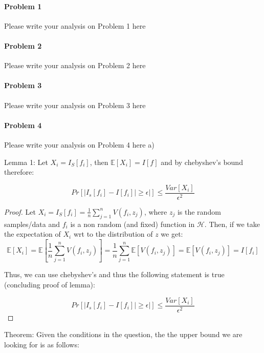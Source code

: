 \documentclass[12pt]{report}
\begin{document}
\maketitle

\paragraph{Problem 1}
Please write your analysis on Problem 1 here


\paragraph{Problem 2}
Please write your analysis on Problem 2 here



\paragraph{Problem 3}
Please write your analysis on Problem 3 here


\paragraph{Problem 4}
Please write your analysis on Problem 4 here
a)


Lemma 1: Let $X_i = I_S[f_i]$, then $\mathbb{E}[X_i] = I[f]$ and by chebyshev's bound therefore:

$$ Pr[ | I_s[f_i] - I[f_i] | \geq \epsilon|] \leq \frac{ Var[X_i] }{ \epsilon^2 } $$

\begin{proof}
Let $X_i = I_S[f_i] = \frac{1}{n} \sum^{n}_{j=1} V(f_i, z_j)$, where $z_j$ is the random samples/data and $f_i$ is a non random (and fixed) function in $\mathcal{H}$. Then, if we take the expectation of $X_i$ wrt to the distribution of $z$ we get:
$$\mathbb{E}[X_i]  = \mathbb{E}[\frac{1}{n} \sum^{n}_{j=1} V(f_i, z_j)] = \frac{1}{n} \sum^{n}_{j=1} \mathbb{E}[V(f_i, z_j)] =  \mathbb{E}[V(f_i, z_j)] = I[f_i]$$

Thus, we can use chebyshev's and thus the following statement is true (concluding proof of lemma):

$$ Pr[ | I_s[f_i] - I[f_i] | \geq \epsilon|] \leq \frac{ Var[X_i] }{ \epsilon^2 } $$

\end{proof}

Theorem: Given the conditions in the question, the the upper bound we are looking for is as follows:
\end{document}
